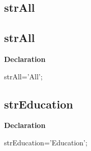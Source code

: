 \documentclass{report}
\newif\ifpdf
\begin{document}
\subsection*{\large{\textbf{strAll}}\normalsize\hspace{1ex}\hrulefill}
\else
\subsection*{strAll}
\fi
\label{trstrings-strAll}
\begin{list}{}{
\setlength{\itemindent}{0cm}
\setlength{\listparindent}{0cm}
\setlength{\leftmargin}{\evensidemargin}
\addtolength{\leftmargin}{\tmplength}
\settowidth{\labelsep}{X}
\addtolength{\leftmargin}{\labelsep}
\setlength{\labelwidth}{\tmplength}
}
\item[\textbf{Declaration}\hfill]
\ifpdf
\begin{flushleft}
\fi
\begin{ttfamily}
strAll='All';\end{ttfamily}

\ifpdf
\end{flushleft}
\fi

\end{list}
\ifpdf
\subsection*{\large{\textbf{strEducation}}\normalsize\hspace{1ex}\hrulefill}
\else
\subsection*{strEducation}
\fi
\label{trstrings-strEducation}
\begin{list}{}{
\setlength{\itemindent}{0cm}
\setlength{\listparindent}{0cm}
\setlength{\leftmargin}{\evensidemargin}
\addtolength{\leftmargin}{\tmplength}
\settowidth{\labelsep}{X}
\addtolength{\leftmargin}{\labelsep}
\setlength{\labelwidth}{\tmplength}
}
\item[\textbf{Declaration}\hfill]
\ifpdf
\begin{flushleft}
\fi
\begin{ttfamily}
strEducation='Education';\end{ttfamily}

\ifpdf
\end{flushleft}
\fi

\end{list}
\ifpdf
\end{document}
